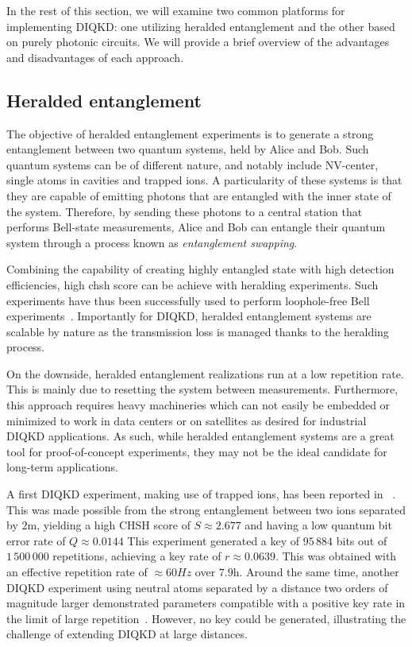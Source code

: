 \medbreak

In the rest of this section, we will examine two common platforms for implementing DIQKD: one utilizing heralded entanglement and the other based on purely photonic circuits. 
We will provide a brief overview of the advantages and disadvantages of each approach.

\subsection{Heralded entanglement}

The objective of heralded entanglement experiments is to generate a strong entanglement between two quantum systems, held by Alice and Bob.
Such quantum systems can be of different nature, and notably include NV-center, single atoms in cavities and trapped ions.
A particularity of these systems is that they are capable of emitting photons that are entangled with the inner state of the system.
Therefore, by sending these photons to a central station that performs Bell-state measurements, Alice and Bob can entangle their quantum system through a process known as \textit{entanglement swapping}.

Combining the capability of creating highly entangled state with high detection efficiencies, high \acrshort{chsh} score can be achieve with heralding experiments. 
Such experiments have thus been successfully used to perform loophole-free Bell experiments~\cite{Hensen2015,Rosenfeld2017}.
Importantly for DIQKD, heralded entanglement systems are scalable by nature as the transmission loss is managed thanks to the heralding process.

On the downside, heralded entanglement realizations run at a low repetition rate. 
This is mainly due to resetting the system between measurements.
Furthermore, this approach requires heavy machineries which can not easily be embedded or minimized to work in data centers or on satellites as desired for industrial DIQKD applications.
As such, while heralded entanglement systems are a great tool for proof-of-concept experiments, they may not be the ideal candidate for long-term applications.

\medbreak

A first DIQKD experiment, making use of trapped ions, has been reported in ~\cite{Nadlinger2022}.
This was made possible from the strong entanglement between two ions separated by $2\mathrm{m}$, yielding a high CHSH score of $S\approx 2.677$ and having a low quantum bit error rate of $Q\approx 0.0144$
This experiment generated a key of $95\,884$ bits out of $1\,500\,000$ repetitions, achieving a key rate of $r \approx 0.0639$. This was obtained with an effective repetition rate of $\approx 60Hz$ over $7.9$h. 
Around the same time, another DIQKD experiment using neutral atoms separated by a distance two orders of magnitude larger demonstrated parameters compatible with a positive key rate in the limit of large repetition~\cite{Zhang2022}. 
However, no key could be generated, illustrating the challenge of extending DIQKD at large distances.

